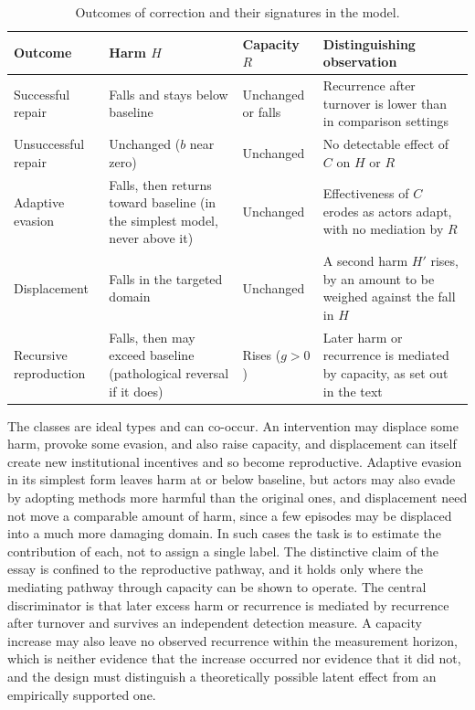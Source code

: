 \documentclass[12pt]{article}
\theoremstyle{remark}
\begin{document}
\begin{table}[ht]
\centering
\small
\setlength{\tabcolsep}{4pt}
\begin{tabular}{p{1.2in}p{1.25in}p{1.15in}p{2.2in}}
\hline
Outcome & Harm $H$ & Capacity $R$ & Distinguishing observation \\
\hline
Successful repair & Falls and stays below baseline & Unchanged or falls & Recurrence after turnover is lower than in comparison settings \\
Unsuccessful repair & Unchanged ($b$ near zero) & Unchanged & No detectable effect of $C$ on $H$ or $R$ \\
Adaptive evasion & Falls, then returns toward baseline (in the simplest model, never above it) & Unchanged & Effectiveness of $C$ erodes as actors adapt, with no mediation by $R$ \\
Displacement & Falls in the targeted domain & Unchanged & A second harm $H'$ rises, by an amount to be weighed against the fall in $H$ \\
Recursive reproduction & Falls, then may exceed baseline (pathological reversal if it does) & Rises ($g>0$) & Later harm or recurrence is mediated by capacity, as set out in the text \\
\hline
\end{tabular}
\caption{Outcomes of correction and their signatures in the model.}
\label{tab:outcomes}
\end{table}

The classes are ideal types and can co-occur. An intervention may displace some harm, provoke some evasion, and also raise capacity, and displacement can itself create new institutional incentives and so become reproductive. Adaptive evasion in its simplest form leaves harm at or below baseline, but actors may also evade by adopting methods more harmful than the original ones, and displacement need not move a comparable amount of harm, since a few episodes may be displaced into a much more damaging domain. In such cases the task is to estimate the contribution of each, not to assign a single label. The distinctive claim of the essay is confined to the reproductive pathway, and it holds only where the mediating pathway through capacity can be shown to operate. The central discriminator is that later excess harm or recurrence is mediated by recurrence after turnover and survives an independent detection measure. A capacity increase may also leave no observed recurrence within the measurement horizon, which is neither evidence that the increase occurred nor evidence that it did not, and the design must distinguish a theoretically possible latent effect from an empirically supported one.
\end{document}
